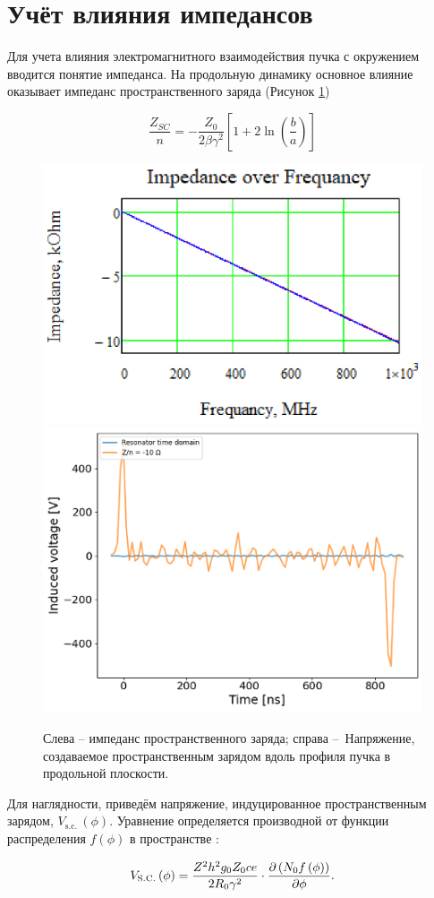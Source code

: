 \documentclass[a4paper]{panl}
\begin{document}
\label{sec:impedance}
\section*{Учёт влияния импедансов}

\par Для учета влияния электромагнитного взаимодействия пучка с ок\-ру\-же\-ни\-ем вводится понятие импеданса. На продольную динамику основное влияние оказывает импеданс пространственного заряда \cite{laclare} (Рисунок \ref{fig:signal}) 

\begin{equation}
\frac{Z_{SC}}{n}=-\frac{Z_0}{2\beta\gamma^2}\left[1+2\ln{\left(\frac{b}{a}\right)}\right]
\label{sc}
\end{equation}

\begin{figure}[!h]
   \includegraphics*[width=.51\columnwidth]{img/fig_06-1}
   \includegraphics*[width=.48\columnwidth]{img/fig_07-1}
   \caption{Слева – импеданс пространственного заряда; справа – Напряжение, создаваемое пространственным 
   зарядом вдоль профиля пучка в продольной плоскости. }
   \label{fig:signal}
\end{figure}

Для наглядности, приведём напряжение, индуцированное про\-стран\-стве\-нным зарядом, $V_{\mathrm{s.c.\ }}(\phi)$. Уравнение определяется производной от функции распределения $f(\phi)$ в пространстве \cite{sc}:

\begin{equation}
V_{\rm{S.C.}}\left(\phi\right)=\frac{Z^2h^2g_0Z_0ce}{2R_0\gamma^2}\cdot\frac{\partial\left(N_0f\left(\phi\right)\right)}{\partial\phi}.
\label{V_sc}
\end{equation}
\end{document}
